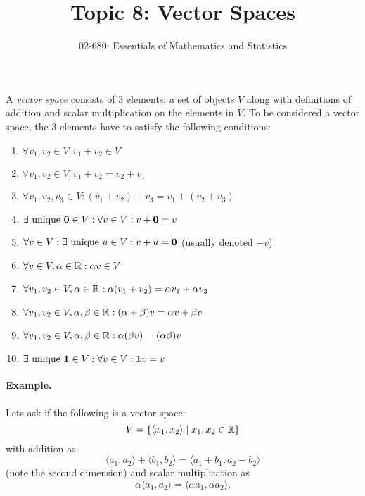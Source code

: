 


\title{Topic 8: Vector Spaces}
\author{02-680: Essentials of Mathematics and Statistics}


\maketitle

A \emph{vector space} consists of 3 elements: 
a set of objects $V$ along with definitions of addition and scalar multiplication on the elements in $V$. 
To be considered a vector space, the 3 elements have to satisfy the following conditions: 
\begin{enumerate}
\item $\forall v_1,v_2 \in V : v_1+v_2 \in V$
\item $\forall v_1,v_2 \in V : v_1 + v_2 = v_2 + v_1$
\item $\forall v_1,v_2,v_3 \in V : (v_1 + v_2) + v_3 = v_1 + (v_2 + v_3)$
\item $\exists \textnormal{ unique }\mathbf{0} \in V : \forall v \in V : v + \mathbf{0} = v$ 
\item $\forall v \in V : \exists \textnormal{ unique }u \in V : v + u = \mathbf{0}$ (usually denoted $-v$)
\item $\forall v\in V, \alpha \in \operatorname{\mathbb{R}}: \alpha v \in V$
\item $\forall v_1,v_2\in V, \alpha \in \operatorname{\mathbb{R}}: \alpha (v_1 + v_2) = \alpha v_1 + \alpha v_2$
\item $\forall v_1,v_2\in V, \alpha,\beta \in \operatorname{\mathbb{R}}: (\alpha+\beta) v = \alpha v + \beta v$
\item $\forall v_1,v_2\in V, \alpha,\beta \in \operatorname{\mathbb{R}}: \alpha(\beta v) = (\alpha\beta) v$
\item$\exists \textnormal{ unique }\mathbf{1} \in V : \forall v \in V : \mathbf{1}v = v$ 
\end{enumerate} 

\paragraph{Example.} 
Lets ask if the following is a vector space: 
\[V = \left\{\left\langle x_1, x_2\right\rangle \mid x_1,x_2 \in \operatorname{\mathbb{R}} \right\}\]
with addition as 
\[ \langle a_1,a_2\rangle + \langle b_1, b_2\rangle = \langle a_1+b_1, a_2-b_2\rangle\]
(note the second dimension)
and scalar multiplication as 
\[\alpha \langle a_1,a_2\rangle = \langle \alpha a_1, \alpha a_2\rangle.\]

